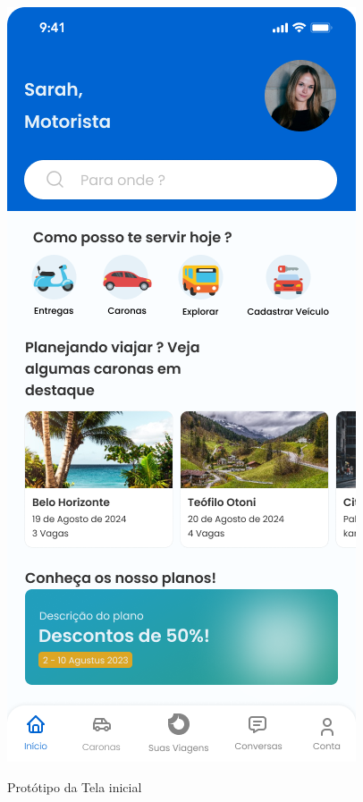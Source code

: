 \begin{figure}[ht]
\begin{minipage}{0.48\textwidth}
 		\label{fig:wireframe}
 	\end{minipage}
 	\hfill %
 	\begin{minipage}{0.48\textwidth}
 		\centering
 		\caption{Protótipo da Tela inicial}
 		\includegraphics[width=\linewidth]{img/prototipo.png}
 		\label{fig:prototipo}
 	\end{minipage}
 \end{figure}
 \clearpage
 
